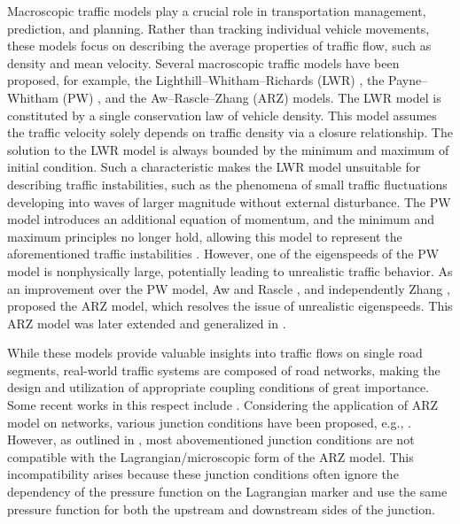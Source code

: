 \documentclass[times,final]{elsarticle}
\numberwithin{equation}{section}
\theoremstyle{definition}
\theoremstyle{remark}
\begin{document}
Macroscopic traffic models play a crucial role in transportation management, prediction, and planning.
Rather than tracking individual vehicle movements, these models focus on describing the average properties of traffic flow, such as density and mean velocity.
Several macroscopic traffic models have been proposed, for example, the Lighthill--Whitham--Richards (LWR) \cite{richards1956shock,lighthill1955kinematic}, the Payne--Whitham (PW) \cite{payne1971model}, and the Aw--Rascle--Zhang (ARZ) \cite{zhang2002non,aw2000resurrection} models.
The LWR model is constituted by a single conservation law of vehicle density. This model assumes the traffic velocity solely depends on traffic density via a closure relationship.
The solution to the LWR model is always bounded by the minimum and maximum of initial condition. Such a characteristic makes the LWR model unsuitable for describing traffic instabilities, such as the phenomena of small traffic fluctuations developing into waves of larger magnitude without external disturbance.
The PW model \cite{payne1971model} introduces an additional equation of momentum, and the minimum and maximum principles no longer hold, allowing this model to represent the aforementioned traffic instabilities \cite{FlynnKasimovNaveRosalesSeibold2009}.
However, one of the eigenspeeds of the PW model is nonphysically large, potentially leading to unrealistic traffic behavior.
As an improvement over the PW model, Aw and Rascle \cite{aw2000resurrection}, and independently Zhang \cite{zhang2002non}, proposed the ARZ model, which resolves the issue of unrealistic eigenspeeds. This ARZ model was later extended and generalized in \cite{Greenberg2002,BerthelinDegondDelitalaRascle2008,gottlich2021second}. 

While these models provide valuable insights into traffic flows on single road segments, real-world traffic systems are composed of road networks, making the design and utilization of appropriate coupling conditions of great importance.
Some recent works in this respect include \cite{BressanCanicSunicaGaravelloHertyPiccoli2014,GaravelloHanPiccoli2016,GaravelloPiccoli2006}.
Considering the application of ARZ model on networks, various junction conditions have been proposed, e.g., \cite{herty2006optimization,garavello2006traffic,haut2007second,siebel2009balanced,gottlich2021second,kolb2018pareto,kolb2017capacity}. However, as outlined in \cite{herty2006coupling}, most abovementioned junction conditions are not compatible with the Lagrangian/microscopic form of the ARZ model. 
This incompatibility arises because these junction conditions often ignore the dependency of the pressure function on the Lagrangian marker and use the same pressure function for both the upstream and downstream sides of the junction.
\end{document}
